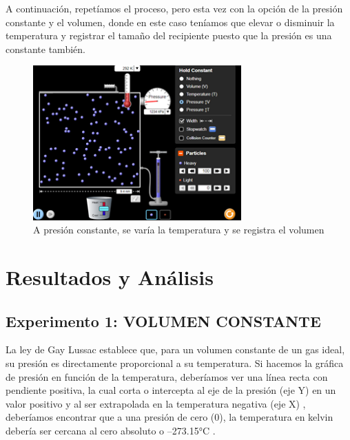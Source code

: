 \documentclass[journal,transmag]{IEEEtran}
\begin{document}
	
	A continuación, repetíamos el proceso, pero esta vez con la opción de la presión constante y el volumen, donde en este caso teníamos que elevar o disminuir la temperatura y registrar el tamaño del recipiente puesto que la presión es una constante también. 
	
	\begin{figure}[!h]
				\center
				\includegraphics[width=8cm]{img/isoba2.png}
				\caption{A presión constante, se varía la temperatura y se registra el volumen}
				\label{f12}
	\end{figure}
	
	
\section{Resultados y Análisis} 

\subsection{Experimento 1: VOLUMEN CONSTANTE}

La ley de Gay Lussac establece que, para un volumen constante de un gas ideal, su presión es directamente proporcional a su temperatura. Si hacemos la gráfica de presión en función de la temperatura, deberíamos ver una línea recta con pendiente positiva, la cual corta o intercepta al eje de la presión (eje Y) en un valor positivo y al ser extrapolada en la temperatura negativa (eje X) , deberíamos encontrar que a una presión de cero (0), la temperatura en kelvin debería ser cercana al cero absoluto o –273.15°C .  
\end{document}
